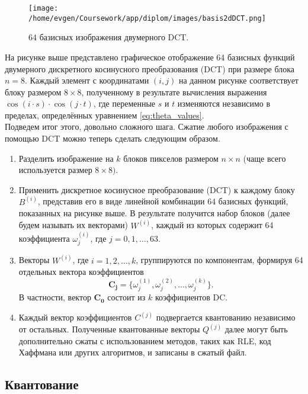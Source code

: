 \begin{figure}[h!]
    \centering
    \texttt{[image: /home/evgen/Coursework/app/diplom/images/basis2dDCT.png]}
    \caption{64 базисных изображения двумерного DCT.}
    \label{fig:basis2dDCT}
\end{figure}


На рисунке выше представлено графическое отображение 64 базисных функций 
двумерного дискретного косинусного преобразования (DCT) при размере блока $n=8$.
 Каждый элемент с координатами $(i,j)$ на данном рисунке соответствует блоку размером $8 \times 8$, 
 полученному в результате вычисления выражения $\cos{(i \cdot s)} \cdot \cos{(j \cdot t)}$, 
 где переменные $s$ и $t$ изменяются независимо в пределах, определённых уравнением \eqref{eq:theta_values}.\\


 Подведем итог этого, довольно сложного шага. Сжатие любого изображения с помощью DCT можно теперь сделать следующим образом.


 \begin{enumerate}
    \item Разделить изображение на $k$ блоков пикселов размером $n \times n$ (чаще всего используется размер $8 \times 8)$.
    \item Применить дискретное косинусное преобразование (DCT) к каждому блоку $B^{(i)}$, представив его в виде линейной комбинации
    64 базисных функций, показанных на рисунке выше. В результате получится набор блоков (далее будем называть их векторами) $W^{(i)}$,
    каждый из которых содержит 64 коэффициента $\omega^{(i)}_{j}$, где $j = 0, 1, \dots, 63$.
    \item Векторы $W^{(i)}$, где $i = 1, 2, \dots, k$, группируются по компонентам, формируя 64 отдельных вектора коэффициентов
    $$
    \mathbf{C_j} = \{ \omega^{(1)}_j, \omega^{(2)}_j, \dots, \omega^{(k)}_j \}.
    $$
    В частности, вектор $\mathbf{C_0}$ состоит из $k$ коэффициентов DC.
    \item Каждый вектор коэффициентов $C^{(j)}$ подвергается квантованию независимо от остальных. 
    Полученные квантованные векторы $Q^{(j)}$ далее могут быть дополнительно сжаты с использованием методов, 
    таких как RLE, код Хаффмана или других алгоритмов, и записаны в сжатый файл.
 \end{enumerate}



\subsection{Квантование}

